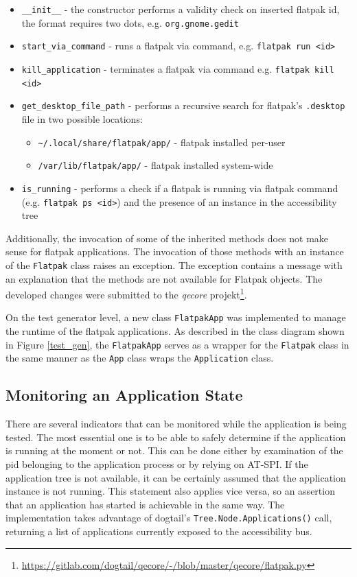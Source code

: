\begin{itemize} 
    \item \texttt{\_\_init\_\_} - the constructor performs a validity check on inserted flatpak id, the format requires two dots, e.g. \texttt{org.gnome.gedit}
    \item \texttt{start\_via\_command} - runs a flatpak via command, e.g. \texttt{flatpak run <id>}
    \item \texttt{kill\_application} - terminates a flatpak via command e.g. \texttt{flatpak kill <id>}
    \item \texttt{get\_desktop\_file\_path} - performs a recursive search for flatpak's \texttt{.desktop} file in two possible locations:
    \begin{itemize}
        \item \texttt{\textasciitilde/.local/share/flatpak/app/} - flatpak installed per-user
        \item \texttt{/var/lib/flatpak/app/} - flatpak installed system-wide
    \end{itemize} 
    \item \texttt{is\_running} - performs a check if a flatpak is running via flatpak command (e.g. \texttt{flatpak ps <id>}) and the presence of an instance in the accessibility tree
\end{itemize}

Additionally, the invocation of some of the inherited methods does not make sense for flatpak applications. The invocation of those methods with an instance of the \texttt{Flatpak} class raises an exception. The exception contains a message with an explanation that the methods are not available for Flatpak objects. The developed changes were submitted to the \textit{qecore} projekt{\footnote{\url{https://gitlab.com/dogtail/qecore/-/blob/master/qecore/flatpak.py}}}.

On the test generator level, a new class \texttt{FlatpakApp} was implemented to manage the runtime of the flatpak applications. As described in the class diagram shown in Figure \ref{test_gen}, the \texttt{FlatpakApp} serves as a wrapper for the \texttt{Flatpak} class in the same manner as the \texttt{App} class wraps the \texttt{Application} class. 

\subsection{Monitoring an Application State}
There are several indicators that can be monitored while the application is being tested. The most essential one is to be able to safely determine if the application is running at the moment or not. This can be done either by examination of the pid belonging to the application process or by relying on AT-SPI. If the application tree is not available, it can be certainly assumed that the application instance is not running. This statement also applies vice versa, so an assertion that an application has started is achievable in the same way. The implementation takes advantage of dogtail's \texttt{Tree.Node.Applications()} call, returning a list of applications currently exposed to the accessibility bus.

